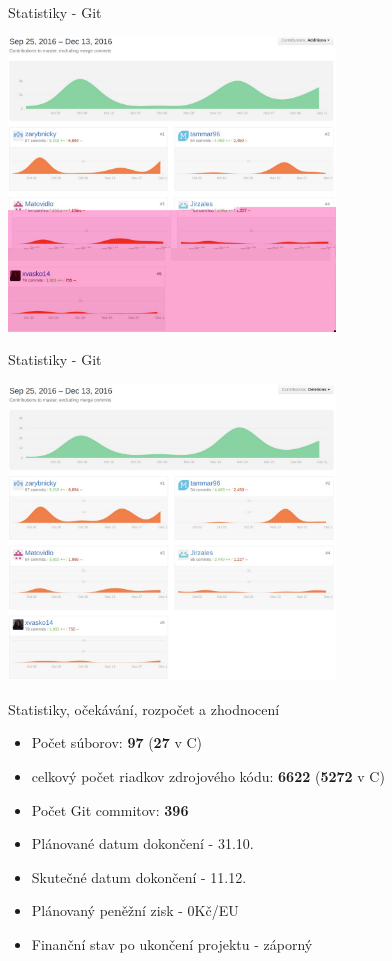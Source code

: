 \documentclass[13pt]{beamer}
\begin{document}
\begin{frame}{Statistiky - Git}
  \begin{center}
    \includegraphics[width=0.65\textwidth]{./img/git_additions.pdf}
  \end{center}
\end{frame}

\begin{frame}{Statistiky - Git}
  \begin{center}
    \includegraphics[width=0.65\textwidth]{./img/git_del.pdf}
  \end{center}
\end{frame}

\begin{frame}{Statistiky, očekávání, rozpočet a zhodnocení}
\begin{itemize}
\item Počet súborov: \textbf{97} (\textbf{27} v C)
\item celkový počet riadkov zdrojového kódu: \textbf{6622} (\textbf{5272} v C)
\item Počet Git commitov: \textbf{396}
\end{itemize}

\begin{itemize}
\item Plánované datum dokončení - 31.10.
\item Skutečné datum dokončení - 11.12.
\item Plánovaný peněžní zisk - 0Kč/EU
\item Finanční stav po ukončení projektu - záporný
\end{itemize}

\end{frame}
\end{document}
